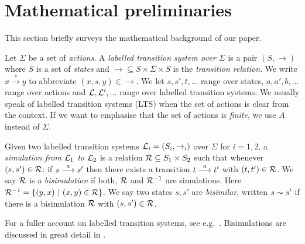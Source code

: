 \section{Mathematical preliminaries}\label{preliminaries}

\NI This section briefly surveys the mathematical background of our
paper.

\begin{definition}
Let $\Sigma$ be a set of \emph{actions}.  A \emph{labelled transition
  system over $\Sigma$} is a pair $(S, \rightarrow)$ where $S$ is a
set of \emph{states} and $\rightarrow \subseteq S \times \Sigma \times
S$ is the \emph{transition relation}.  We write $x \xrightarrow{s} y$
to abbreviate $(x,s,y) \in \rightarrow$. We let $s, s', t, ...$ range
over states, $a, a', b, ...$ range over actions and $\mathcal{L}, \mathcal{L}', ...$
range over labelled transition systems. We usually speak of labelled
transition systems (LTS) when the set of actions is clear from the
context. If we want to emphasise that the set of actions is
\emph{finite}, we use $A$ instead of $\Sigma$.
\end{definition}

\begin{definition}
Given two labelled transition systems $\mathcal{L}_i = (S_i, \rightarrow_i)$
over $\Sigma$ for $i = 1, 2$, a \emph{simulation from $\mathcal{L}_1$ to $\mathcal{L}_2$}
is a relation $\mathcal{R} \subseteq S_1 \times S_2$ such that whenever $(s,
s') \in \mathcal{R}$: if $s \stackrel{a}{\longrightarrow} s'$ then there exists a transition $t
\stackrel{a}{\longrightarrow} t'$ with $(t, t') \in \mathcal{R}$.  We say $\mathcal{R}$ is a
\emph{bisimulation} if both, $\mathcal{R}$ and $\mathcal{R}^{-1}$ are
simulations. Here $\mathcal{R}^{-1} = \{(y, x)\ |\ (x, y) \in \mathcal{R}\}$.
We say two states $s, s'$ are \emph{bisimilar}, written $s \sim s'$
if there is a bisimulation $\mathcal{R}$ with $(s, s') \in \mathcal{R}$.
\end{definition}

\NI For a fuller account on labelled transition systems, see
e.g.~\cite{SassoneV:modcontac,HennessyM:Algtheop}. Bisimulations are
discussed in great detail in \cite{SangiorgiD:intbisac}.
